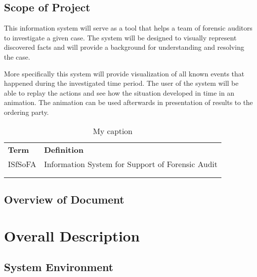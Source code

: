 \subsection{Scope of Project}
This information system will serve as a tool that helps a team of forensic auditors to investigate a given case. The system will be designed to visually represent discovered facts and will provide a background for understanding and resolving the case. 

More specifically this system will provide visualization of all known events that happened during the investigated time period. The user of the system will be able to replay the actions and see how the situation developed in time in an animation. The animation can be used afterwards in presentation of results to the ordering party. 

\begin{table}[]
\centering
\caption{My caption}
\label{my-label}
\begin{tabular}{ll}
\textbf{Term} & \textbf{Definition} \\
ISfSoFA       &Information System for Support of Forensic Audit\\
              &                     \\
              &                    
\end{tabular}
\end{table}

\subsection{Overview of Document}

\section {Overall Description}

\subsection{System Environment}











